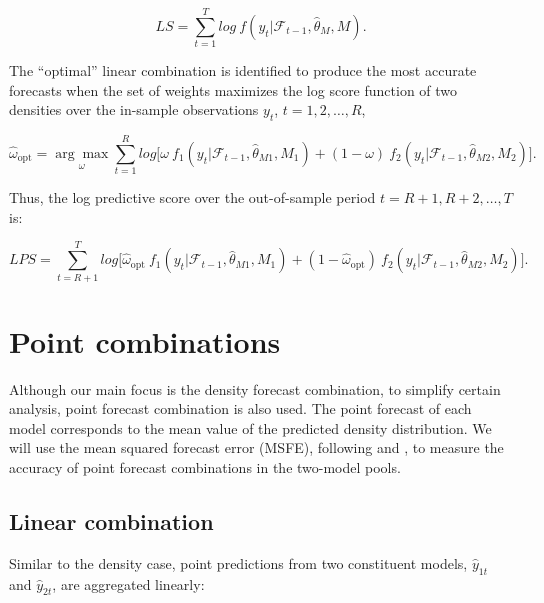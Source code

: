 \documentclass{monashthesis}
\begin{document}
\begin{equation}
\label{eqn:LS1}
LS = \sum^T_{t=1} log \ f(y_t| \mathcal{F}_{t-1}, \hat\theta_M, M).
\end{equation}

The ``optimal'' linear combination is identified to produce the most accurate forecasts when the set of weights maximizes the log score function of two densities over the in-sample observations \(y_t\), \(t = 1, 2, \dots, R\),

\begin{equation}
\label{eqn:LS2}
\hat{\omega}_{\text{opt}} = \underset{\omega}{\arg\max} \sum^R_{t=1} log \Big[ \omega \ f_1(y_t| \mathcal{F}_{t-1}, \hat\theta_{M1}, M_1) + (1-\omega) \ f_2(y_t| \mathcal{F}_{t-1}, \hat\theta_{M2}, M_2)\Big].
\end{equation}

Thus, the log predictive score over the out-of-sample period \(t = R+1, R+2, \dots, T\) is:

\begin{equation}
\label{eqn:LS3}
LPS = \sum^T_{t = R+1} log \Big[ \hat{\omega}_{\text{opt}} \ f_1(y_t| \mathcal{F}_{t-1}, \hat\theta_{M1}, M_1) + (1- \hat{\omega}_{\text{opt}}) \ f_2(y_t| \mathcal{F}_{t-1}, \hat\theta_{M2}, M_2)\Big].
\end{equation}

\hypertarget{point-combinations}{%
\section{Point combinations}\label{point-combinations}}

Although our main focus is the density forecast combination, to simplify certain analysis, point forecast combination is also used. The point forecast of each model corresponds to the mean value of the predicted density distribution. We will use the mean squared forecast error (MSFE), following \textcite{BG69} and \textcite{SW09}, to measure the accuracy of point forecast combinations in the two-model pools.

\hypertarget{linear-combination}{%
\subsection{Linear combination}\label{linear-combination}}

Similar to the density case, point predictions from two constituent models, \(\hat y_{1t}\) and \(\hat y_{2t}\), are aggregated linearly:
\end{document}

